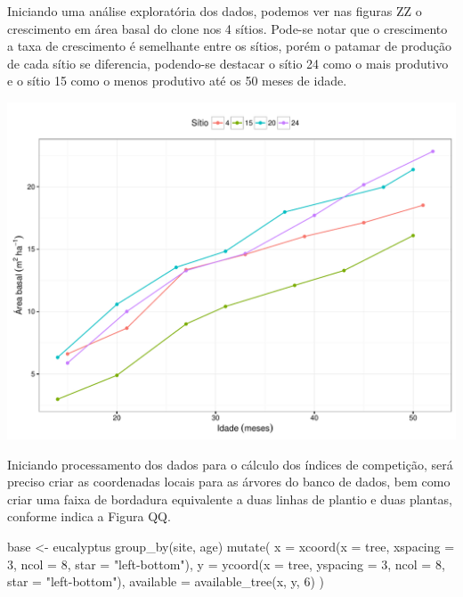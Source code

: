\documentclass[article]{jss}
\begin{document}
Iniciando uma análise exploratória dos dados, podemos ver nas figuras ZZ
o crescimento em área basal do clone nos 4 sítios. Pode-se notar que o
crescimento a taxa de crescimento é semelhante entre os sítios, porém o
patamar de produção de cada sítio se diferencia, podendo-se destacar o
sítio 24 como o mais produtivo e o sítio 15 como o menos produtivo até
os 50 meses de idade.

\begin{CodeChunk}


\begin{center}\includegraphics{comp3-paper_files/figure-latex/unnamed-chunk-8-1} \end{center}

\end{CodeChunk}

Iniciando processamento dos dados para o cálculo dos índices de
competição, será preciso criar as coordenadas locais para as árvores do
banco de dados, bem como criar uma faixa de bordadura equivalente a duas
linhas de plantio e duas plantas, conforme indica a Figura QQ.

\begin{CodeChunk}
\begin{CodeInput}
base <- eucalyptus %
  group_by(site, age) %
  mutate(
    x = xcoord(x = tree, xspacing =  3, ncol =  8, star = "left-bottom"),
    y = ycoord(x = tree, yspacing =  3, ncol =  8, star = "left-bottom"),
    available = available_tree(x, y, 6)
  ) 
\end{CodeInput}
\end{CodeChunk}
\end{document}
